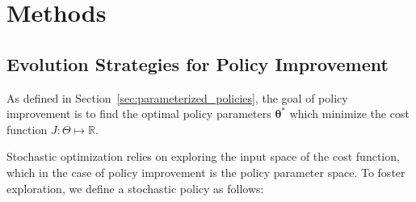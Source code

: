\documentclass[12pt]{article}
\newcommand{\mymath}[1]{\ensuremath{#1}\xspace}
\newcommand{\app}    {\mymath{\bm{\theta}}}
\newcommand{\appsp}  {\mymath{\Theta}}
\newcommand{\taskp}  {\mymath{\mathbf{q}}}
\newcommand{\taskpv} {\mymath{q}}
\newcommand{\taskpsp}{\mymath{Q}}
\newcommand{\costf}  {\mymath{J}}
\DeclareMathOperator*{\argmin}{arg\,min}
\newcommand{\argminvar}[1]{\ensuremath{\underset{#1}{{\argmin}}}}
\begin{document}
%

\section{Methods}

\subsection{Evolution Strategies for Policy Improvement}
\label{sec:evolution_strategies}

As defined in Section~\ref{sec:parameterized_policies}, the goal of policy improvement is to find the optimal policy parameters $\app^*$ which minimize the cost function $J:\appsp \mapsto \mathbb{R}$.

Stochastic optimization relies on exploring the input space of the cost function, which in the case of policy improvement is the policy parameter space. To foster exploration, we define a stochastic policy as follows:
\end{document}
